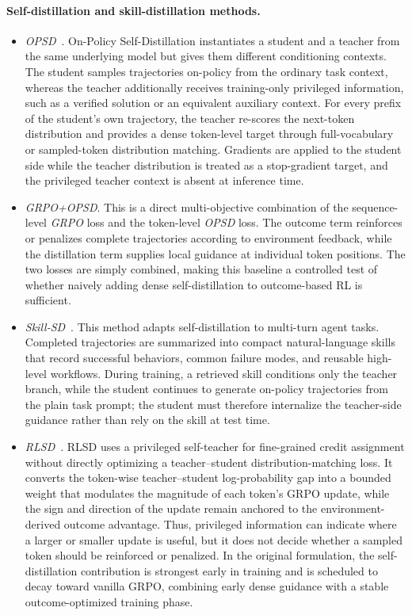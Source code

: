 \paragraph{Self-distillation and skill-distillation methods.}
\begin{itemize}
    \item \textit{OPSD}~\citep{zhao2026opsd}. On-Policy Self-Distillation instantiates a student and a teacher from the same underlying model but gives them different conditioning contexts. The student samples trajectories on-policy from the ordinary task context, whereas the teacher additionally receives training-only privileged information, such as a verified solution or an equivalent auxiliary context. For every prefix of the student's own trajectory, the teacher re-scores the next-token distribution and provides a dense token-level target through full-vocabulary or sampled-token distribution matching. Gradients are applied to the student side while the teacher distribution is treated as a stop-gradient target, and the privileged teacher context is absent at inference time.

    \item \textit{GRPO+OPSD}. This is a direct multi-objective combination of the sequence-level \textit{GRPO} loss and the token-level \textit{OPSD} loss. The outcome term reinforces or penalizes complete trajectories according to environment feedback, while the distillation term supplies local guidance at individual token positions. The two losses are simply combined, making this baseline a controlled test of whether naively adding dense self-distillation to outcome-based RL is sufficient.

    \item \textit{Skill-SD}~\citep{wang2026skillsd}. This method adapts self-distillation to multi-turn agent tasks. Completed trajectories are summarized into compact natural-language skills that record successful behaviors, common failure modes, and reusable high-level workflows. During training, a retrieved skill conditions only the teacher branch, while the student continues to generate on-policy trajectories from the plain task prompt; the student must therefore internalize the teacher-side guidance rather than rely on the skill at test time. 

    \item \textit{RLSD}~\citep{yang2026rlsd}. RLSD uses a privileged self-teacher for fine-grained credit assignment without directly optimizing a teacher--student distribution-matching loss. It converts the token-wise teacher--student log-probability gap into a bounded weight that modulates the magnitude of each token's GRPO update, while the sign and direction of the update remain anchored to the environment-derived outcome advantage. Thus, privileged information can indicate where a larger or smaller update is useful, but it does not decide whether a sampled token should be reinforced or penalized. In the original formulation, the self-distillation contribution is strongest early in training and is scheduled to decay toward vanilla GRPO, combining early dense guidance with a stable outcome-optimized training phase.


\end{itemize}
